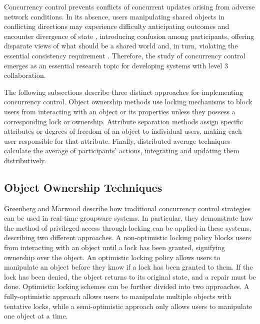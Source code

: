     Concurrency control prevents conflicts of concurrent updates arising from adverse network conditions. In its absence, users manipulating shared objects in conflicting directions may experience difficulty anticipating outcomes and encounter divergence of state \cite{robertsControllingConsistencyCollaborative2004}, introducing confusion among participants, offering disparate views of what should be a shared world and, in turn, violating the essential consistency requirement \cite{sungConcurrencyControlCIAO1999}. Therefore, the study of concurrency control emerges as an essential research topic for developing systems with level 3 collaboration.

    The following subsections describe three distinct approaches for implementing concurrency control. Object ownership methods use locking mechanisms to block users from interacting with an object or its properties unless they possess a corresponding lock or ownership. Attribute separation methods assign specific attributes or degrees of freedom of an object to individual users, making each user responsible for that attribute. Finally, distributed average techniques calculate the average of participants' actions, integrating and updating them distributively.

    \subsection{Object Ownership Techniques}

    Greenberg and Marwood \cite{greenbergRealTimeGroupware1994} describe how traditional concurrency control strategies can be used in real-time groupware systems. In particular, they demonstrate how the method of privileged access through locking can be applied in these systems, describing two different approaches. A non-optimistic locking policy blocks users from interacting with an object until a lock has been granted, signifying ownership over the object. An optimistic locking policy allows users to manipulate an object before they know if a lock has been granted to them. If the lock has been denied, the object returns to its original state, and a repair must be done. Optimistic locking schemes can be further divided into two approaches. A fully-optimistic approach allows users to manipulate multiple objects with tentative locks, while a semi-optimistic approach only allows users to manipulate one object at a time.

